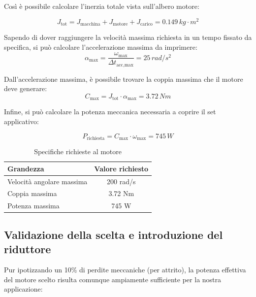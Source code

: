 \documentclass[a4paper,12pt]{article}
\begin{document}
\vspace{0.5em}

Così è possibile calcolare l'inerzia totale vista sull'albero motore:

\vspace{0.3em}

\[
    J_{\text{tot}} = J_{\text{macchina}} + J_{\text{motore}} + J_{\text{carico}} = 0.149\,kg \cdot m^2
\]

\vspace{0.5em}

Sapendo di dover raggiungere la velocità massima richiesta in un tempo fissato da specifica, si può calcolare l'accelerazione massima da imprimere:
\vspace{0.5em}
\[
    \alpha_{\text{max}} = \frac{\omega_{\text{max}}}{\Delta t_{\text{acc,max}}}=25 \, rad/s^2
\]

\vspace{0.5em}

Dall'accelerazione massima, è possibile trovare la coppia massima che il motore deve generare:
\[
    C_{\text{max}} = J_{\text{tot}} \cdot \alpha_{\text{max}} = 3.72 \,Nm
\]

\vspace{0.5em}
Infine, si può calcolare la potenza meccanica necessaria a coprire il set applicativo:

\[
    P_{\text{richiesta}} = C_{\text{max}} \cdot \omega_{\text{max}} = 745\,W
\]

\vspace{0.5cm}

\begin{table}[h!]
    \centering
    \begin{tabular}{|l|c|}
    \hline
    \textbf{Grandezza} & \textbf{Valore richiesto} \\ \hline
    Velocità angolare massima  & 200 rad/s\quad \\ \hline
    Coppia massima & 3.72 Nm\quad \\ \hline
    Potenza massima & 745 W\quad \\ \hline
    \end{tabular}
    \caption{Specifiche richieste al motore}
\end{table}


\subsection{Validazione della scelta e introduzione del riduttore}

Pur ipotizzando un 10\% di perdite meccaniche (per attrito), la potenza effettiva del motore scelto risulta comunque ampiamente sufficiente per la nostra applicazione:
\end{document}
